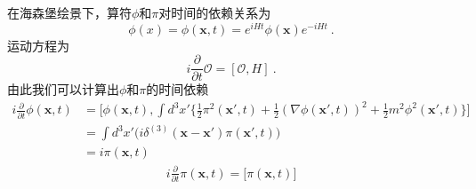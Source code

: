 
在海森堡绘景下，算符$\phi$和$\pi$对时间的依赖关系为
\begin{equation}
\phi(x) = \phi(\mathbf x, t) = e^{i H t}\phi(\mathbf x)e^{-iHt}~.
\end{equation}
运动方程为 
\begin{equation}
i \frac{\partial}{\partial t}\mathcal O = [\mathcal O, H]~.
\end{equation}
由此我们可以计算出$\phi$和$\pi$的时间依赖
\begin{equation}
\begin{aligned}
i \frac{\partial}{\partial t} \phi(\mathbf x,t) & = \bigg[\phi(\mathbf x,t),\int d^3 x' \bigg\{ \frac{1}{2} \pi^2 (\mathbf x',t) + \frac{1}{2} (\nabla \phi(\mathbf x',t))^2 + \frac{1}{2} m^2 \phi^2(\mathbf x',t) \bigg\}\bigg] \\
& = \int d^3 x' \bigg(i \delta^{(3)} (\mathbf x - \mathbf x') \pi(\mathbf x',t) \bigg) \\
& = i \pi (\mathbf x, t)
\end{aligned}
\end{equation}
\begin{equation}
\begin{aligned}
i\frac{\partial}{\partial t} \pi(\mathbf x, t) = \bigg[ \pi(\mathbf x,t) \bigg]
\end{aligned}
\end{equation}
